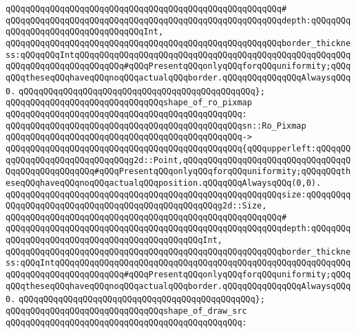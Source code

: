 \verb|qQQqqQQqqQQqqQQqqQQqqQQqqQQqqQQqqQQqqQQqqQQqqQQqqQQqqQQq#|\newline
\verb|qQQqqQQqqQQqqQQqqQQqqQQqqQQqqQQqqQQqqQQqqQQqqQQqqQQqqQQqdepth:qQQqqQQqqQQqqQQqqQQqqQQqqQQqqQQqqQQqInt,|\newline
\verb|qQQqqQQqqQQqqQQqqQQqqQQqqQQqqQQqqQQqqQQqqQQqqQQqqQQqqQQqborder_thickness:qQQqqQQqIntqQQqqQQqqQQqqQQqqQQqqQQqqQQqqQQqqQQqqQQqqQQqqQQqqQQqqQQqqQQqqQQqqQQqqQQqqQQqqQQq#qQQqPresentqQQqonlyqQQqforqQQquniformity;qQQqqQQqtheseqQQqhaveqQQqnoqQQqactualqQQqborder.qQQqqQQqqQQqqQQqAlwaysqQQq0.|\newline
\verb|qQQqqQQqqQQqqQQqqQQqqQQqqQQqqQQqqQQqqQQqqQQqqQQq};|\newline
\newline
\verb|qQQqqQQqqQQqqQQqqQQqqQQqqQQqqQQqshape_of_ro_pixmap|\newline
\verb|qQQqqQQqqQQqqQQqqQQqqQQqqQQqqQQqqQQqqQQqqQQqqQQq:|\newline
\verb|qQQqqQQqqQQqqQQqqQQqqQQqqQQqqQQqqQQqqQQqqQQqqQQqsn::Ro_Pixmap|\newline
\verb|qQQqqQQqqQQqqQQqqQQqqQQqqQQqqQQqqQQqqQQqqQQqqQQq->|\newline
\verb|qQQqqQQqqQQqqQQqqQQqqQQqqQQqqQQqqQQqqQQqqQQqqQQq{qQQqupperleft:qQQqqQQqqQQqqQQqqQQqqQQqqQQqqQQqg2d::Point,qQQqqQQqqQQqqQQqqQQqqQQqqQQqqQQqqQQqqQQqqQQqqQQqqQQq#qQQqPresentqQQqonlyqQQqforqQQquniformity;qQQqqQQqtheseqQQqhaveqQQqnoqQQqactualqQQqposition.qQQqqQQqAlwaysqQQq(0,0).|\newline
\verb|qQQqqQQqqQQqqQQqqQQqqQQqqQQqqQQqqQQqqQQqqQQqqQQqqQQqqQQqsize:qQQqqQQqqQQqqQQqqQQqqQQqqQQqqQQqqQQqqQQqqQQqqQQqqQQqg2d::Size,|\newline
\verb|qQQqqQQqqQQqqQQqqQQqqQQqqQQqqQQqqQQqqQQqqQQqqQQqqQQqqQQq#|\newline
\verb|qQQqqQQqqQQqqQQqqQQqqQQqqQQqqQQqqQQqqQQqqQQqqQQqqQQqqQQqdepth:qQQqqQQqqQQqqQQqqQQqqQQqqQQqqQQqqQQqqQQqqQQqqQQqInt,|\newline
\verb|qQQqqQQqqQQqqQQqqQQqqQQqqQQqqQQqqQQqqQQqqQQqqQQqqQQqqQQqborder_thickness:qQQqIntqQQqqQQqqQQqqQQqqQQqqQQqqQQqqQQqqQQqqQQqqQQqqQQqqQQqqQQqqQQqqQQqqQQqqQQqqQQqqQQqqQQq#qQQqPresentqQQqonlyqQQqforqQQquniformity;qQQqqQQqtheseqQQqhaveqQQqnoqQQqactualqQQqborder.qQQqqQQqqQQqqQQqAlwaysqQQq0.|\newline
\verb|qQQqqQQqqQQqqQQqqQQqqQQqqQQqqQQqqQQqqQQqqQQqqQQq};|\newline
\newline
\verb|qQQqqQQqqQQqqQQqqQQqqQQqqQQqqQQqshape_of_draw_src|\newline
\verb|qQQqqQQqqQQqqQQqqQQqqQQqqQQqqQQqqQQqqQQqqQQqqQQq:|\newline
